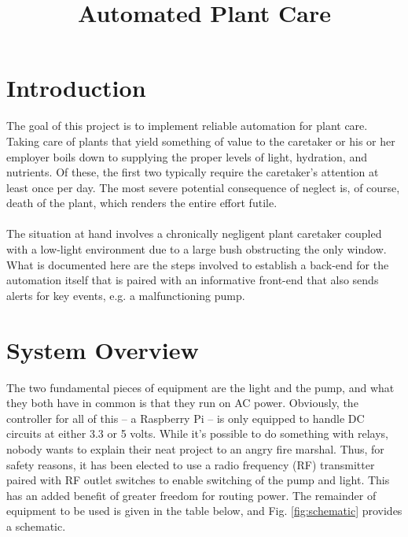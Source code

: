 \documentclass[]{article}
\title{Automated Plant Care}
\date{}
\begin{document}
\maketitle

\section{Introduction}
The goal of this project is to implement reliable automation for plant care.  Taking care of plants that yield something of value to the caretaker or his or her employer boils down to supplying the proper levels of light, hydration, and nutrients.  Of these, the first two typically require the caretaker's attention at least once per day.  The most severe potential consequence of neglect is, of course, death of the plant, which renders the entire effort futile.
\\\\
The situation at hand involves a chronically negligent plant caretaker coupled with a low-light environment due to a large bush obstructing the only window.  What is documented here are the steps involved to establish a back-end for the automation itself that is paired with an informative front-end that also sends alerts for key events, e.g. a malfunctioning pump.

\section{System Overview}
The two fundamental pieces of equipment are the light and the pump, and what they both have in common is that they run on AC power.  Obviously, the controller for all of this -- a Raspberry Pi -- is only equipped to handle DC circuits at either 3.3 or 5 volts.  While it's possible to do something with relays, nobody wants to explain their neat project to an angry fire marshal.  Thus, for safety reasons, it has been elected to use a radio frequency (RF) transmitter paired with RF outlet switches to enable switching of the pump and light.  This has an added benefit of greater freedom for routing power.  The remainder of equipment to be used is given in the table below, and Fig. \ref{fig:schematic} provides a schematic.
\end{document}
